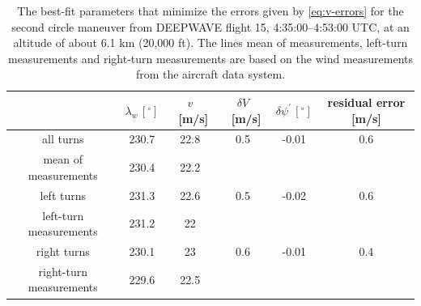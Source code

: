 \documentclass[12pt,twoside,english]{article}\usepackage[]{graphicx}\usepackage[]{color}
\providecommand{\tabularnewline}{\\}
\begin{document}
\begin{center}
\begin{table}[H] 
\begin{centering}
\begin{tabular}{cccccc}
\toprule%
 & $\lambda_w\,[^{\circ}]$  & $v$~{[}m/s{]}  & $\delta V$~{[}m/s{]}  & $\delta\psi^{\prime}\,[^{\circ}]$  & residual error {[}m/s{]}\tabularnewline 
\midrule 
\midrule  all turns & 230.7 & 22.8 & 0.5 & -0.01 & 0.6\tabularnewline 
\midrule  mean of measurements & 230.4 & 22.2 &  &  & \tabularnewline 
\midrule  left turns & 231.3 & 22.6 & 0.5 & -0.02 & 0.6\tabularnewline 
\midrule  left-turn measurements & 231.2 & 22 &  & & \tabularnewline 
\midrule  right turns & 230.1 & 23 & 0.6 & -0.01 & 0.4\tabularnewline 
\midrule  right-turn measurements & 229.6 & 22.5 &  & & \tabularnewline 
\bottomrule 
\end{tabular}
\par\end{centering}

\protect\caption[The best-fit parameters that minimize the errors given by \eqref{eq:v-errors} for the second circle maneuver from DEEPWAVE flight 15.]{The best-fit parameters that minimize the errors given by \eqref{eq:v-errors} for the second circle maneuver from DEEPWAVE flight 15, 4:35:00--4:53:00 UTC, at an altitude of about 6.1 km (20,000 ft). The lines \textquotedbl{}mean of measurements\textquotedbl{}, \textquotedbl{}left-turn measurements\textquotedbl{} and \textquotedbl{}right-turn measurements\textquotedbl{} are based on the wind measurements from the aircraft data system.\label{tab:GS2min}}
\end{table}

\par\end{center}
\end{document}
